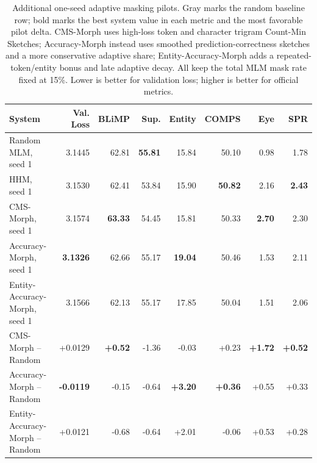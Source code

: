 \begin{table}[t]
\centering
\fontsize{8.4}{9.0}\selectfont
\setlength{\tabcolsep}{3.0pt}
\renewcommand{\arraystretch}{1.0}
\begin{tabular}{@{}l r r r r r r r@{}}
\toprule
\textbf{System} & \textbf{Val. Loss} & \textbf{BLiMP} & \textbf{Sup.} & \textbf{Entity} & \textbf{COMPS} & \textbf{Eye} & \textbf{SPR} \\
\midrule
\rowcolor{tablegray}
Random MLM, seed 1 & 3.1445 & 62.81 & \textbf{55.81} & 15.84 & 50.10 & 0.98 & 1.78 \\
HHM, seed 1 & 3.1530 & 62.41 & 53.84 & 15.90 & \textbf{50.82} & 2.16 & \textbf{2.43} \\
\rowcolor{tablegray}
CMS-Morph, seed 1 & 3.1574 & \textbf{63.33} & 54.45 & 15.81 & 50.33 & \textbf{2.70} & 2.30 \\
Accuracy-Morph, seed 1 & \textbf{3.1326} & 62.66 & 55.17 & \textbf{19.04} & 50.46 & 1.53 & 2.11 \\
\rowcolor{tablegray}
Entity-Accuracy-Morph, seed 1 & 3.1566 & 62.13 & 55.17 & 17.85 & 50.04 & 1.51 & 2.06 \\
\midrule
CMS-Morph -- Random & +0.0129 & \textbf{+0.52} & -1.36 & -0.03 & +0.23 & \textbf{+1.72} & \textbf{+0.52} \\
\rowcolor{tablegray}
Accuracy-Morph -- Random & \textbf{-0.0119} & -0.15 & -0.64 & \textbf{+3.20} & \textbf{+0.36} & +0.55 & +0.33 \\
Entity-Accuracy-Morph -- Random & +0.0121 & -0.68 & -0.64 & +2.01 & -0.06 & +0.53 & +0.28 \\
\bottomrule
\end{tabular}
\caption{Additional one-seed adaptive masking pilots. Gray marks the random baseline row; bold marks the best system value in each metric and the most favorable pilot delta. CMS-Morph uses high-loss token and character trigram Count-Min Sketches; Accuracy-Morph instead uses smoothed prediction-correctness sketches and a more conservative adaptive share; Entity-Accuracy-Morph adds a repeated-token/entity bonus and late adaptive decay. All keep the total MLM mask rate fixed at 15\%. Lower is better for validation loss; higher is better for official metrics.}
\label{tab:cms-morph-pilot}
\end{table}
